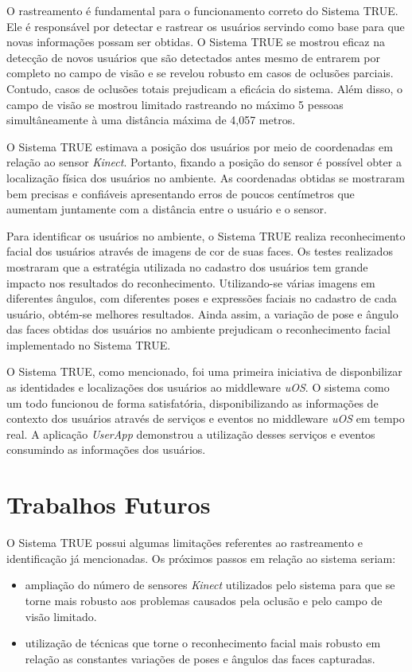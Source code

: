 O rastreamento é fundamental para o funcionamento correto do Sistema TRUE. Ele é responsável por detectar e rastrear os usuários servindo como base para que novas informações possam ser obtidas. O Sistema TRUE se mostrou eficaz na detecção de novos usuários que são detectados antes mesmo de entrarem por completo no campo de visão e se revelou robusto em casos de oclusões parciais. Contudo, casos de oclusões totais prejudicam a eficácia do sistema. Além disso, o campo de visão se mostrou limitado rastreando no máximo 5 pessoas simultâneamente à uma distância máxima de 4,057 metros.

O Sistema TRUE estimava a posição dos usuários por meio de coordenadas em relação ao sensor \textit{Kinect}. Portanto, fixando a posição do sensor é possível obter a localização física dos usuários no ambiente. As coordenadas obtidas se mostraram bem precisas e confiáveis apresentando erros de poucos centímetros que aumentam juntamente com a distância entre o usuário e o sensor. 

Para identificar os usuários no ambiente, o Sistema TRUE realiza reconhecimento
facial dos usuários através de imagens de cor de suas faces. Os testes
realizados mostraram que a estratégia utilizada no cadastro dos usuários tem
grande impacto nos resultados do reconhecimento. Utilizando-se várias imagens
em diferentes ângulos, com diferentes poses e expressões faciais no cadastro de
cada usuário, obtém-se melhores resultados. Ainda assim, a variação de pose e
ângulo das faces obtidas dos usuários no ambiente prejudicam o reconhecimento
facial implementado no Sistema TRUE.

O Sistema TRUE, como mencionado, foi uma primeira iniciativa de disponbilizar as identidades e localizações dos usuários ao middleware \textit{uOS}. O sistema como um todo funcionou de forma satisfatória, disponibilizando as informações de contexto dos usuários através de serviços e eventos no middleware \textit{uOS} em tempo real. A aplicação \textit{UserApp} demonstrou a utilização desses serviços e eventos consumindo as informações dos usuários.

\section{Trabalhos Futuros}

O Sistema TRUE possui algumas limitações referentes ao rastreamento e identificação já mencionadas. Os próximos passos em relação ao sistema seriam:

\begin{itemize}
	\item ampliação do número de sensores \textit{Kinect} utilizados pelo sistema para que se torne mais robusto aos problemas causados pela oclusão e pelo campo de visão limitado.
	\item utilização de técnicas que torne o reconhecimento facial mais robusto em relação as constantes variações de poses e ângulos das faces capturadas.
\end{itemize}




